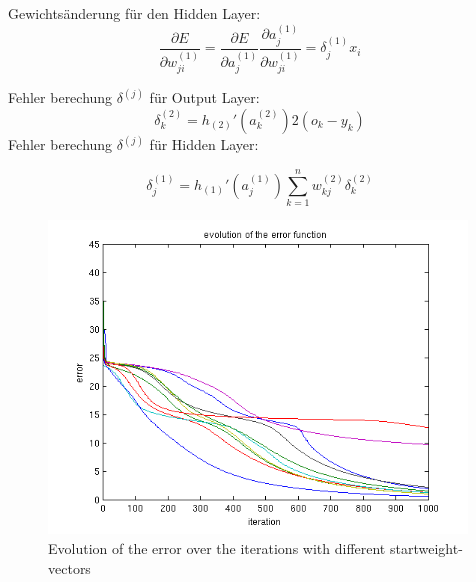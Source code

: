 Gewichtsänderung für den Hidden Layer:
\begin{equation}
 \frac{\partial E}{\partial w_{ji}^{(1)}} = \frac{\partial E}{\partial a_{j}^{(1)}} \frac{\partial a_{j}^{(1)}}{\partial w_{ji}^{(1)}} = \delta_j^{(1)} x_i
\end{equation}

Fehler berechung $\delta^{(j)}$ für Output Layer:
\begin{equation}
 \delta_k^{(2)} = h_{(2)}' (a_k^{(2)}) 2 (o_k - y_k)
\end{equation}
Fehler berechung $\delta^{(j)}$ für Hidden Layer:

\begin{equation}
 \delta_j^{(1)} = h_{(1)}' (a_j^{(1)}) \sum\limits_{k=1}^n w_{kj}^{(2)} \delta_k^{(2)}
\end{equation}



\begin{figure}[hp!]
\begin{center}
 \includegraphics[width=0.99\textwidth]{./figures/1/error}
 \caption{Evolution of the error over the iterations with different startweight-vectors}
\label{fig:backprop_error}
\end{center}
\end{figure}



